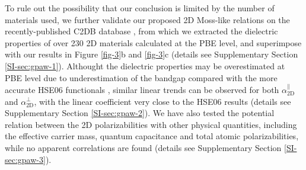 \documentclass[journal=ancac3,manuscript=article,email=true,hyperref=true,keywords=false]{achemso}
\begin{document}
To rule out the possibility that our conclusion is limited by the
number of materials used, we further validate our proposed 2D
Moss-like relations on the recently-published C2DB database
\cite{Haastrup_2018}, from which we extracted the dielectric
properties of over 230 2D materials calculated at the PBE level, and
superimpose with our results in Figure \ref{fig-3}b and \ref{fig-3}c
(details see Supplementary Section \ref{SI-sec:gpaw-1}). Althought the
dielectric properties may be overestimated at PBE level due to
underestimation of the bandgap compared with the more accurate HSE06
functionals \cite{Van_Dyck_2017}, similar linear trends can be
observed for both $\alpha^{\parallel}_{\mathrm{2D}}$ and
$\alpha_{\mathrm{2D}}^{\perp}$, with the linear coefficient very close
to the HSE06 results (details see Supplementary Section
\ref{SI-sec:gpaw-2}). We have also tested the potential relation
between the 2D polarizabilities with other physical quantities,
including the effective carrier mass, quantum capacitance and total
atomic polarizabilities, while no apparent correlations are found
(details see Supplementary Section \ref{SI-sec:gpaw-3}).
\end{document}
